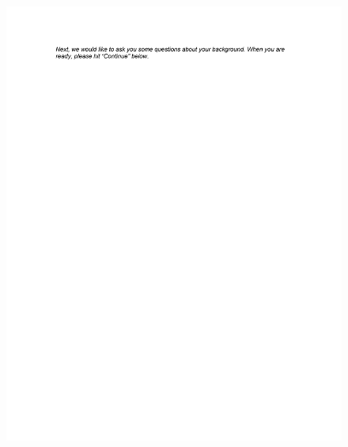 \documentclass[12pt,econ]{sources/authesis}
\makeatletter
\def\maxwidth{\ifdim\Gin@nat@width>\linewidth\linewidth
\else\Gin@nat@width\fi}
\let\Oldincludegraphics\includegraphics
\renewcommand{\includegraphics}[1]{\Oldincludegraphics[width=\maxwidth]{#1}}
\makeatother
\begin{document}
\begin{figure}[hbt]
  \centering
\includegraphics{data/framing/appendix/questionnaire/questionnaire08.jpg}
\end{figure}
\end{document}
